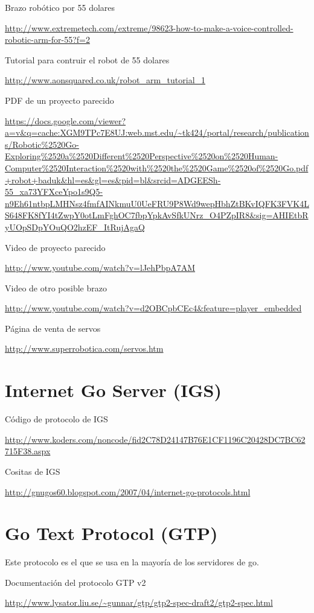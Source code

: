 \documentclass[12pt,a4paper]{report}
\begin{document}
Brazo robótico por 55 dolares

\url{http://www.extremetech.com/extreme/98623-how-to-make-a-voice-controlled-robotic-arm-for-55?f=2}

Tutorial para contruir el robot de 55 dolares

\url{http://www.aonsquared.co.uk/robot_arm_tutorial_1}

PDF de un proyecto parecido

\url{https://docs.google.com/viewer?a=v&q=cache:XGM9TPc7E8UJ:web.mst.edu/~tk424/portal/research/publications/Robotic%
}

Video de proyecto parecido

\url{http://www.youtube.com/watch?v=lJehPbpA7AM}

Video de otro posible brazo

\url{http://www.youtube.com/watch?v=d2OBCpbCEc4&feature=player_embedded}

Página de venta de servos

\url{http://www.superrobotica.com/servos.htm}


\section{Internet Go Server (IGS)}

Código de protocolo de IGS

\url{http://www.koders.com/noncode/fid2C78D24147B76E1CF1196C20428DC7BC62715F38.aspx}

Cositas de IGS

\url{http://gnugos60.blogspot.com/2007/04/internet-go-protocols.html}

\section{Go Text Protocol (GTP)}

Este protocolo es el que se usa en la mayoría de los servidores de go. 

Documentación del protocolo GTP v2

\url{http://www.lysator.liu.se/~gunnar/gtp/gtp2-spec-draft2/gtp2-spec.html }
\end{document}
